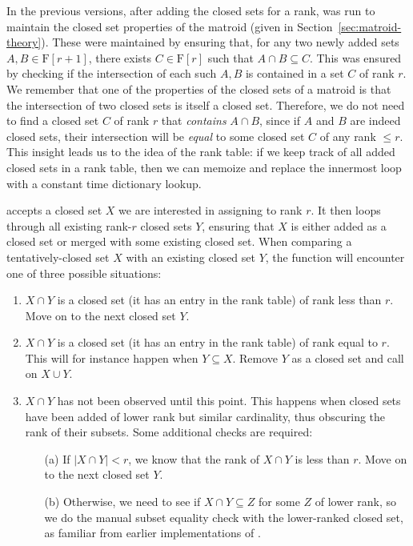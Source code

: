 In the previous versions, after adding the closed sets for a rank,  was run to maintain the closed set properties of the matroid (given in Section~\ref{sec:matroid-theory}). These were maintained by ensuring that, for any two newly added sets $A,B \in \mathrm{F}[r+1]$, there exists $C \in \mathrm{F}[r]$ such that $A \cap B \subseteq C$. This was ensured by checking if the intersection of each such $A,B$ is contained in a set $C$ of rank $r$. We remember that one of the properties of the closed sets of a matroid is that the intersection of two closed sets is itself a closed set. Therefore, we do not need to find a closed set $C$ of rank $r$ that \textit{contains} $A \cap B$, since if $A$ and $B$ are indeed closed sets, their intersection will be \textit{equal} to some closed set $C$ of any rank $\leq r$. This insight leads us to the idea of the rank table: if we keep track of all added closed sets in a rank table, then we can memoize  and replace the innermost loop with a constant time dictionary lookup. 

 accepts a closed set $X$ we are interested in assigning to rank $r$. It then loops through all existing rank-$r$ closed sets $Y$, ensuring that $X$ is either added as a closed set or merged with some existing closed set. When comparing a tentatively-closed set $X$ with an existing closed set $Y$, the function will encounter one of three possible situations:
\begin{enumerate}
  \item $X\cap Y$ is a closed set (it has an entry in the rank table) of rank less than $r$. Move on to the next closed set $Y$.
  \item $X\cap Y$ is a closed set (it has an entry in the rank table) of rank equal to $r$. This will for instance happen when $Y\subseteq X$. Remove $Y$ as a closed set and call  on $X \cup Y$.
  \item $X\cap Y$ has not been observed until this point. This happens when closed sets have been added of lower rank but similar cardinality, thus obscuring the rank of their subsets. Some additional checks are required:
  \begin{enumerate}
    \item[(a)] If $|X\cap Y| < r$, we know that the rank of $X\cap Y$ is less than $r$. Move on to the next closed set $Y$.
    \item[(b)] Otherwise, we need to see if $X\cap Y \subseteq Z$ for some $Z$ of lower rank, so we do the manual subset equality check with the lower-ranked closed set, as familiar from earlier implementations of .
  \end{enumerate}
\end{enumerate}


